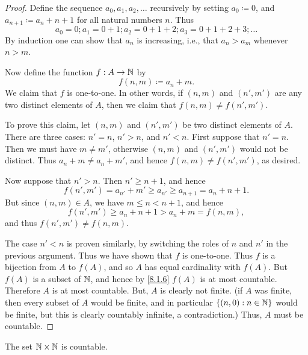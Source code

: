 \begin{proof}
	Define the sequence \(a_0, a_1, a_2, \dots\) recursively by setting \(a_0 \coloneqq 0\), and \(a_{n + 1} \coloneqq a_n + n + 1\) for all natural numbers \(n\).
	Thus
	\[
		a_0 = 0; a_1 = 0 + 1; a_2 = 0 + 1 + 2; a_3 = 0 + 1 + 2 + 3; \dots
	\]
	By induction one can show that \(a_n\) is increasing, i.e., that \(a_n > a_m\) whenever \(n > m\).

	Now define the function \(f : A \to \mathbb{N}\) by
	\[
		f(n, m) \coloneqq a_n + m.
	\]
	We claim that \(f\) is one-to-one.
	In other words, if \((n, m)\) and \((n', m')\) are any two distinct elements of \(A\), then we claim that \(f(n, m) \neq f(n', m')\).

	To prove this claim, let \((n, m)\) and \((n', m')\) be two distinct elements of \(A\).
	There are three cases: \(n' = n\), \(n' > n\), and \(n' < n\).
	First suppose that \(n' = n\).
	Then we must have \(m \neq m'\), otherwise \((n, m)\) and \((n', m')\) would not be distinct.
	Thus \(a_n + m \neq a_n + m'\), and hence \(f(n, m) \neq f(n', m')\), as desired.

	Now suppose that \(n' > n\).
	Then \(n' \geq n + 1\), and hence
	\[
		f(n', m') = a_{n'} + m' \geq a_{n'} \geq a_{n + 1} = a_n + n + 1.
	\]
	But since \((n, m) \in A\), we have \(m \leq n < n + 1\), and hence
	\[
		f(n', m') \geq a_n + n + 1 > a_n + m = f(n, m),
	\]
	and thus \(f(n', m') \neq f(n, m)\).

	The case \(n' < n\) is proven similarly, by switching the roles of \(n\) and \(n'\) in the previous argument.
	Thus we have shown that \(f\) is one-to-one.
	Thus \(f\) is a bijection from \(A\) to \(f(A)\), and so \(A\) has equal cardinality with \(f(A)\).
	But \(f(A)\) is a subset of \(\mathbb{N}\), and hence by \cref{8.1.6} \(f(A)\) is at most countable.
	Therefore \(A\) is at most countable.
	But, \(A\) is clearly not finite.
	(if \(A\) was finite, then every subset of \(A\) would be finite, and in particular \(\left\lbrace(n, 0) : n \in \mathbb{N}\right\rbrace\) would be finite, but this is clearly countably infinite, a contradiction.)
	Thus, \(A\) must be countable.
\end{proof}

\begin{cor}\label{8.1.13}
	The set \(\mathbb{N} \times \mathbb{N}\) is countable.
\end{cor}

